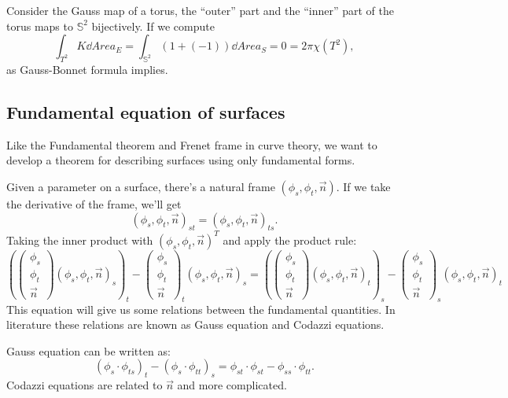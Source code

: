 \begin{example}
    Consider the Gauss map of a torus, the ``outer'' part
	and the ``inner'' part of the torus maps to $\mathbb{S}^2$ bijectively.
	If we compute
	\[
	\int _{T^2} K \dd Area_E = \int _{\mathbb{S}^2} (1 + (-1))\dd Area_S
	= 0 = 2\pi \chi(T^2),
	\]
	as Gauss-Bonnet formula implies.
\end{example}

\subsection{Fundamental equation of surfaces}
\label{sub:Fundamental equation of surfaces}

Like the Fundamental theorem and Frenet frame in curve theory, we want to develop a
theorem for describing surfaces using only fundamental forms.

Given a parameter on a surface, there's a natural frame $(\phi_s, \phi_t, \vec{n})$.
If we take the derivative of the frame, we'll get
\[
	(\phi_s, \phi_t, \vec{n})_{st} = (\phi_s, \phi_t, \vec{n})_{ts}.
\]
Taking the inner product with $(\phi_s,\phi_t,\vec{n})^T$ and apply the product rule:
\[
\left( \begin{pmatrix}\phi_s\\\phi_t\\\vec{n}\end{pmatrix}
(\phi_s,\phi_t,\vec{n})_s \right)_t
- \begin{pmatrix}\phi_s\\\phi_t\\\vec{n}\end{pmatrix}_t
(\phi_s,\phi_t,\vec{n})_s
= \left( \begin{pmatrix}\phi_s\\\phi_t\\\vec{n}\end{pmatrix}
(\phi_s,\phi_t,\vec{n})_t \right)_s
- \begin{pmatrix}\phi_s\\\phi_t\\\vec{n}\end{pmatrix}_s
(\phi_s,\phi_t,\vec{n})_t
\]
This equation will give us some relations between the fundamental quantities.
In literature these relations are known as Gauss equation and Codazzi equations.

Gauss equation can be written as:
\[
	(\phi_s\cdot \phi_{ts})_t - (\phi_s\cdot \phi_{tt})_s
	= \phi_{st}\cdot \phi_{st} - \phi_{ss}\cdot \phi_{tt}.
\]
Codazzi equations are related to $\vec{n}$ and more complicated.


